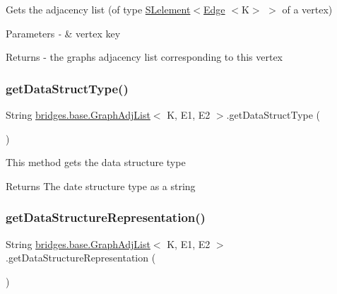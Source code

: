 Gets the adjacency list (of type \mbox{\hyperlink{classbridges_1_1base_1_1_s_lelement}{S\+Lelement}}$<$\mbox{\hyperlink{classbridges_1_1base_1_1_edge}{Edge}} $<$\+K$>$ $>$ of a vertex)


\begin{DoxyParams}{Parameters}
{\em -\/} & vertex key\\
\hline
\end{DoxyParams}
\begin{DoxyReturn}{Returns}
-\/ the graph\textquotesingle{}s adjacency list corresponding to this vertex 
\end{DoxyReturn}
\mbox{\label{classbridges_1_1base_1_1_graph_adj_list_a40c4a2faf20c9847e8ba0d8024236a4b}} 
\subsubsection{\texorpdfstring{getDataStructType()}{getDataStructType()}}
{\footnotesize\ttfamily String \mbox{\hyperlink{classbridges_1_1base_1_1_graph_adj_list}{bridges.\+base.\+Graph\+Adj\+List}}$<$ K, E1, E2 $>$.get\+Data\+Struct\+Type (\begin{DoxyParamCaption}{ }\end{DoxyParamCaption})}

This method gets the data structure type

\begin{DoxyReturn}{Returns}
The date structure type as a string 
\end{DoxyReturn}
\mbox{\label{classbridges_1_1base_1_1_graph_adj_list_a9bba66056cdf24197c41fff455e19a6c}} 
\subsubsection{\texorpdfstring{getDataStructureRepresentation()}{getDataStructureRepresentation()}}
{\footnotesize\ttfamily String \mbox{\hyperlink{classbridges_1_1base_1_1_graph_adj_list}{bridges.\+base.\+Graph\+Adj\+List}}$<$ K, E1, E2 $>$.get\+Data\+Structure\+Representation (\begin{DoxyParamCaption}{ }\end{DoxyParamCaption})}

